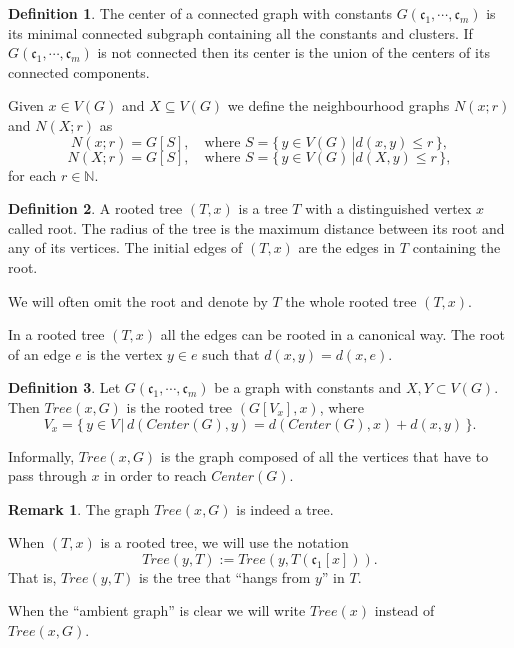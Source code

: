\documentclass[11pt,notitlepage,a4paper]{article}
\theoremstyle{definition}
\newtheorem{definition}{Definition}[section]
\newtheorem{remark}{Remark}[section]
\newcommand{\cc}{\mathfrak{c}}
\newcommand{\N}{\mathbb{N}}
\newcommand{\clist}{\mathfrak{c}_{1}, \cdots, \mathfrak{c}_m}
\begin{document}
\begin{definition}
	The center of a connected graph with constants $G(\clist)$ is its minimal 
	connected subgraph containing all the constants and clusters. If $G(\clist)$
	is not connected then its center is the union of the centers of its connected
	components.   
\end{definition}


Given $x\in V(G)$ and $X\subseteq V(G)$ we define the
neighbourhood graphs $N(x;r)$ and $N(X;r)$ as
\[ N(x;r)= G[S], \quad \text{where } S=\{\, y\in V(G) \, | d(x,y)\leq r \, \}, \]
\[ N(X;r)= G[S], \quad \text{where } S=\{\, y\in V(G) \, | d(X,y)\leq r \, \}, \]
for each $r\in \N$.


\begin{definition}
	 A rooted tree $(T,x)$ is a tree $T$ with a distinguished vertex 
	 $x$ called root.
	 The radius of the tree is the 
	 maximum distance between its root and any
	 of its vertices.  
	 The initial edges of $(T,x)$ are the edges in $T$ containing
	 the root.
\end{definition}

We will often omit the root and denote by $T$ the whole rooted tree $(T,x)$.\par 

In a rooted tree $(T,x)$ all the edges can be rooted in a canonical way. 
The root of an edge $e$ is the vertex $y\in e$ such that $d(x,y)=d(x,e)$.

\begin{definition}
	Let $G(\clist)$ be a graph with constants and $X,Y\subset V(G)$. Then
	$Tree(x,G)$ is the rooted tree $(G[V_x],x)$, where
	\[ V_x= \{\, y\in V \, | \, d(Center(G),y)= d(Center(G),x)+ d(x,y) \,	 \}. \]
\end{definition}

Informally, $Tree(x,G)$ is the graph composed of all the vertices that
have to pass through $x$ in order to reach $Center(G)$.

\begin{remark}
	The graph $Tree(x,G)$ is indeed a tree.
\end{remark}

When $(T,x)$ is a rooted tree, we will use the notation
\[ Tree(y, T):= Tree(y,T(\cc_1[x])). \]
That is, $Tree(y,T)$ is the tree that ``hangs from $y$'' in
$T$.

When the ``ambient graph'' is clear we will write $Tree(x)$
instead of $Tree(x,G)$. 
\end{document}
